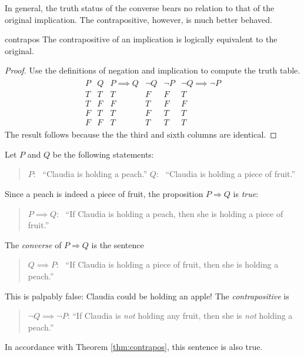 In general, the truth status of the converse bears no relation to that of the original implication. The contrapositive, however, is much better behaved.

\begin{thm}{}{contrapos}
	The contrapositive of an implication is logically equivalent to the original.
\end{thm}

\begin{proof}
	Use the definitions of negation and implication to compute the truth table.
	\begin{gather*}
		\begin{array}{cc|c||cc|c}
			P & Q & P\implies Q & \neg Q & \neg P & \neg Q\implies\neg P\\\hline
			T & T & T & F & F & T\\
			T & F & F & T & F & F\\
			F & T & T & F & T & T\\
			F & F & T & T & T & T
		\end{array}
	\end{gather*}
	The result follows because the the third and sixth columns are identical.\footnotemark
\end{proof}





\begin{example}{}{}
	Let $P$ and $Q$ be the following statements:
	\begin{quote}
	  $P$: \ ``Claudia is holding a peach.''\qquad\qquad
	  $Q$: \ ``Claudia is holding a piece of fruit.''
	\end{quote}
	Since a peach is indeed a piece of fruit, the proposition $P\Longrightarrow Q$ is \emph{true}:
	\begin{quote}
		$P\implies Q$: \ ``If Claudia is holding a peach, then she is holding a piece of fruit.''
	\end{quote}
	The \emph{converse} of $P\Longrightarrow Q$ is the sentence
	\begin{quote}
	  $Q\implies P$: \ ``If Claudia is holding a piece of fruit, then she is holding a peach.''
	\end{quote}
	This is palpably false: Claudia could be holding an apple! The \emph{contrapositive} is
	\begin{quote}
	  $\neg Q\implies \neg P$: ``If Claudia is \emph{not} holding any fruit, then she is \emph{not} holding a peach.''
	\end{quote}
	In accordance with Theorem \ref{thm:contrapos}, this sentence is also true.
\end{example}

